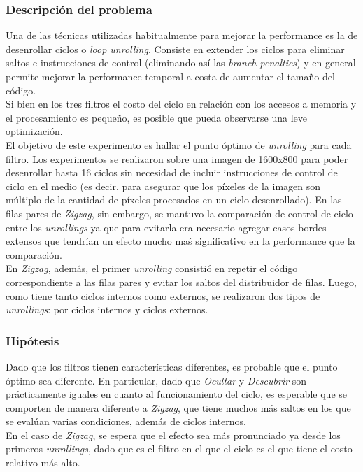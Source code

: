 \documentclass[a4paper]{article}
\begin{document}
\subsubsection{Descripción del problema}
Una de las técnicas utilizadas habitualmente para mejorar la performance es la de desenrollar ciclos o \textit{loop unrolling}. Consiste en extender los ciclos para eliminar saltos e instrucciones de control (eliminando así las \textit{branch penalties}) y en general permite mejorar la performance temporal a costa de aumentar el tamaño del código. \\
Si bien en los tres filtros el costo del ciclo en relación con los accesos a memoria y el procesamiento es pequeño, es posible que pueda observarse una leve optimización. \\
El objetivo de este experimento es hallar el punto óptimo de \textit{unrolling} para cada filtro.
Los experimentos se realizaron sobre una imagen de 1600x800 para poder desenrollar hasta 16 ciclos sin necesidad de incluir instrucciones de control de ciclo en el medio (es decir, para asegurar que los píxeles de la imagen son múltiplo de la cantidad de píxeles procesados en un ciclo desenrollado). En las filas pares de \textit{Zigzag}, sin embargo, se mantuvo la comparación de control de ciclo entre los \textit{unrollings} ya que para evitarla era necesario agregar casos bordes extensos que tendrían un efecto mucho maś significativo en la performance que la comparación. \\
En \textit{Zigzag}, además, el primer \textit{unrolling} consistió en repetir el código correspondiente a las filas pares y evitar los saltos del distribuidor de filas. Luego, como tiene tanto ciclos internos como externos, se realizaron dos tipos de \textit{unrollings}: por ciclos internos y ciclos externos.

\subsubsection{Hipótesis}
Dado que los filtros tienen características diferentes, es probable que el punto óptimo sea diferente. En particular, dado que \textit{Ocultar} y \textit{Descubrir} son prácticamente iguales en cuanto al funcionamiento del ciclo, es esperable que se comporten de manera diferente a \textit{Zigzag}, que tiene muchos más saltos en los que se evalúan varias condiciones, además de ciclos internos. \\
En el caso de \textit{Zigzag}, se espera que el efecto sea más pronunciado ya desde los primeros \textit{unrollings}, dado que es el filtro en el que el ciclo es el que tiene el costo relativo más alto. 
\end{document}
